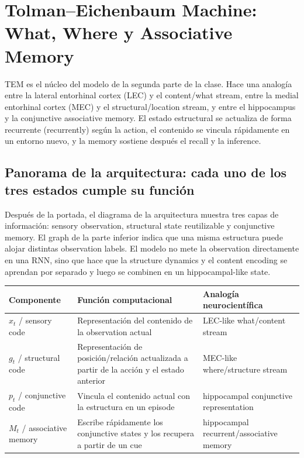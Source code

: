 \section{Tolman--Eichenbaum Machine: What, Where y Associative Memory}

TEM es el núcleo del modelo de la segunda parte de la clase. Hace una analogía entre la lateral entorhinal cortex (LEC) y el content/what stream, entre la medial entorhinal cortex (MEC) y el structural/location stream, y entre el hippocampus y la conjunctive associative memory. El estado estructural se actualiza de forma recurrente (recurrently) según la action, el contenido se vincula rápidamente en un entorno nuevo, y la memory sostiene después el recall y la inference.

\subsection{Panorama de la arquitectura: cada uno de los tres estados cumple su función}

Después de la portada, el diagrama de la arquitectura muestra tres capas de información: sensory observation, structural state reutilizable y conjunctive memory. El graph de la parte inferior indica que una misma estructura puede alojar distintas observation labels. El modelo no mete la observation directamente en una RNN, sino que hace que la structure dynamics y el content encoding se aprendan por separado y luego se combinen en un hippocampal-like state.



\begin{longtable}{@{}L{0.17\textwidth}L{0.31\textwidth}L{0.40\textwidth}@{}}
\toprule
Componente & Función computacional & Analogía neurocientífica \\
\midrule
$x_t$ / sensory code & Representación del contenido de la observation actual & LEC-like what/content stream \\
$g_t$ / structural code & Representación de posición/relación actualizada a partir de la acción y el estado anterior & MEC-like where/structure stream \\
$p_t$ / conjunctive code & Vincula el contenido actual con la estructura en un episode & hippocampal conjunctive representation \\
$M_t$ / associative memory & Escribe rápidamente los conjunctive states y los recupera a partir de un cue & hippocampal recurrent/associative memory \\
\bottomrule
\end{longtable}

